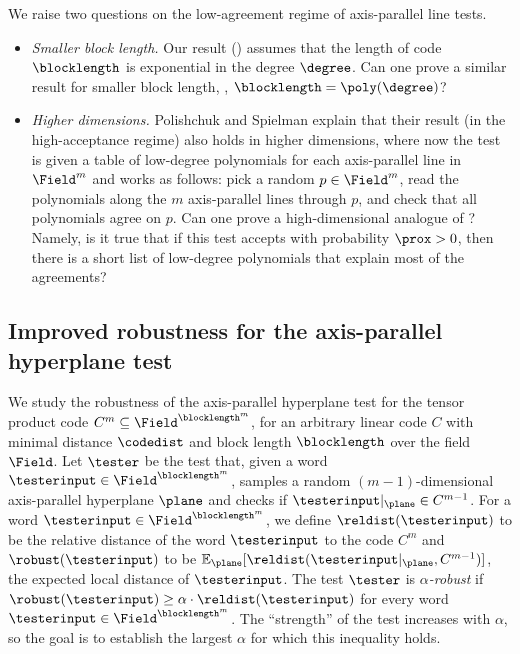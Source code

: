 \documentclass{toc}
\theoremstyle{plain}
\begin{document}

We raise two questions on the low-agreement regime of axis-parallel line tests.
\begin{itemize}

  \item \emph{Smaller block length.}
  Our result () assumes that the length of code $\blocklength$ is exponential in the degree $\degree$. Can one prove a similar result for smaller block length, \eg, $\blocklength=\poly(\degree)$?

  \item \emph{Higher dimensions.}
  Polishchuk and Spielman \cite{PolishchukS94} explain that their result (in the high-acceptance regime) also holds in higher dimensions, where now the test is given a table of low-degree polynomials for each axis-parallel line in $\Field^m$ and works as follows: pick a random $p \in \Field^m$, read the polynomials along the $m$ axis-parallel lines through $p$, and check that all polynomials agree on $p$. Can one prove a high-dimensional analogue of ? Namely, is it true that if this test accepts with probability $\prox > 0$, then there is a short list of low-degree polynomials that explain most of the agreements?

\end{itemize}
%
%
\subsection{Improved robustness for the axis-parallel hyperplane test}
\label{sec:result-robustness}

We study the robustness of the axis-parallel hyperplane test for the tensor product code $C^{m} \subseteq \Field^{\blocklength^{m}}$, for an arbitrary linear code $C$ with minimal distance $\codedist$ and block length $\blocklength$ over the field $\Field$. Let $\tester$ be the test that, given a word $\testerinput \in \Field^{\blocklength^{m}}$, samples a random $(m-1)$-dimensional axis-parallel hyperplane $\plane$ and checks if $\testerinput \vert_{\plane} \in C^{m-1}$. For a word $\testerinput \in \Field^{\blocklength^{m}}$, we define $\reldist(\testerinput)$ to be the relative distance of the word $\testerinput$ to the code $C^{m}$ and $\robust(\testerinput)$ to be $\mathbb E_{\plane} [\reldist(\testerinput \vert_{\plane}, C^{m-1})]$, the expected local distance of $\testerinput$. The test $\tester$ is \emph{$\alpha$-robust} if $\robust(\testerinput) \geq \alpha \cdot \reldist(\testerinput)$ for every word $\testerinput \in \Field^{\blocklength^{m}}$. The ``strength'' of the test increases with $\alpha$, so the goal is to establish the largest $\alpha$ for which this inequality holds.
\end{document}

